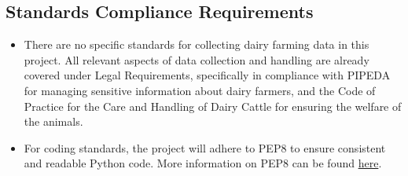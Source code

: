 \documentclass[12pt]{article}
\begin{document}
\subsection{Standards Compliance Requirements}
\begin{itemize}
	\item There are no specific standards for collecting dairy farming data in
	      this project. All relevant aspects of data collection and handling are
	      already covered under Legal Requirements, specifically in compliance
	      with PIPEDA for managing sensitive information about dairy farmers, 
          and the Code of Practice for the Care and Handling of Dairy Cattle for
	      ensuring the welfare of the animals.
	\item For coding standards, the project will adhere to PEP8 to ensure
	      consistent and readable Python code. More information on PEP8 can be
	      found \href{https://peps.python.org/pep-0008/}{here}.
\end{itemize}
\end{document}
